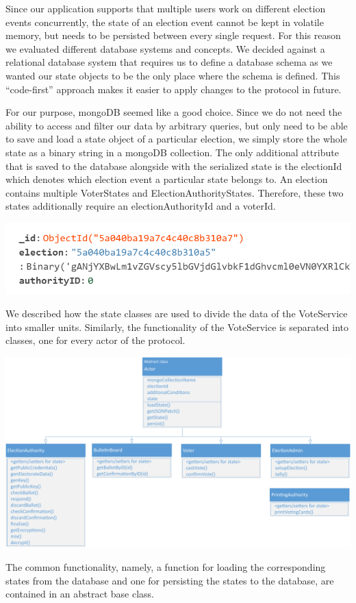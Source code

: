 Since our application supports that multiple users work on different election events concurrently, the state of an election event cannot be kept in volatile memory, but needs to be persisted between every single request. For this reason we evaluated different database systems and concepts. We decided against a relational database system that requires us to define a database schema as we wanted our state objects to be the only place where the schema is defined. This "`code-first"' approach makes it easier to apply changes to the protocol in future. 

For our purpose, mongoDB seemed like a good choice. Since we do not need the ability to access and filter our data by arbitrary queries, but only need to be able to save and load a state object of a particular election, we simply store the whole state as a binary string in a mongoDB collection. The only additional attribute that is saved to the database alongside with the serialized state is the electionId which denotes which election event a particular state belongs to. An election contains multiple VoterStates and ElectionAuthorityStates. Therefore, these two states additionally require an electionAuthorityId and a voterId.

\begin{center}
\includegraphics[scale=0.75]{assets/db.png}
\label{Example: ElectionAuthority document collection}%
\end{center}

We described how the state classes are used to divide the data of the VoteService into smaller units. Similarly, the functionality of the VoteService is separated into classes, one for every actor of the protocol.

\begin{center}
\includegraphics[scale=0.60]{assets/uml_actors.pdf}
\label{Actor classes}%
\end{center}
The common functionality, namely, a function for loading the corresponding states from the database and one for persisting the states to the database, are contained in an abstract base class.

